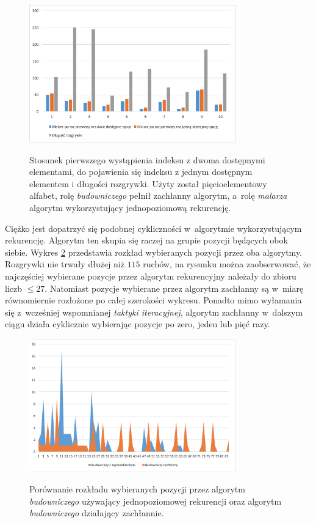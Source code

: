 \documentclass[document]{xmgr}
\begin{document}
\begin{figure}[tbh]
    \centering
    \caption{Stosunek pierwszego wystąpienia indeksu z dwoma dostępnymi elementami, do pojawienia się indeksu z jednym dostępnym elementem i długości rozgrywki. Użyty został pięcioelementowy alfabet, rolę \emph{budowniczego} pełnił zachłanny algorytm, a~rolę \emph{malarza} algorytm wykorzystujący jednopoziomową rekurencję.}
    \includegraphics[width = 0.8\textwidth]{images/builder0efficiency}
    \label{fig:builder0Efficiency}
\end{figure}

Ciężko jest dopatrzyć się podobnej cykliczności w~algorytmie wykorzystującym rekurencję. Algorytm ten skupia się raczej na grupie pozycji będących obok siebie. Wykres \ref{fig:buildersPickedIndexes} przedstawia rozkład wybieranych pozycji przez oba algorytmy. Rozgrywki nie trwały dłużej niż $115$ ruchów, na rysunku można zaobserwować, że najczęściej wybierane pozycje przez algorytm rekurencyjny należały do zbioru liczb $\leq 27$. Natomiast pozycje wybierane przez algorytm zachłanny są w~miarę równomiernie rozłożone po całej szerokości wykresu. Ponadto mimo wyłamania się z~wcześniej wspomnianej \emph{taktyki iteracyjnej}, algorytm zachłanny w~dalszym ciągu działa cyklicznie wybierając pozycje po zero, jeden lub pięć razy.

\begin{figure}[tbh]
    \centering
    \caption{Porównanie rozkładu wybieranych pozycji przez algorytm \emph{budowniczego} używający jednopoziomowej rekurencji oraz algorytm \emph{budowniczego} działający zachłannie.}
    \includegraphics[width = 0.8\textwidth]{images/buildersPickedIndexes}
    \label{fig:buildersPickedIndexes}
\end{figure}
\end{document}
